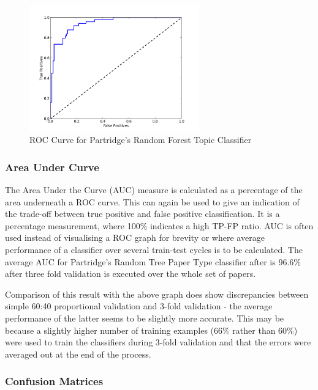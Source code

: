 \begin{figure}[!h]
\begin{center}
\includegraphics[width=0.65\textwidth]{images/testing/ROC.png}
\caption{ ROC Curve for Partridge's Random Forest Topic Classifier}
\label{fig:roc_random_forest}
\end{center}
\end{figure}

\subsubsection{ Area Under Curve }

The Area Under the Curve (AUC) measure is calculated as a percentage of  the
area underneath a ROC curve. This can again be used to give an indication of
the trade-off between true positive and false positive classification. It is a
percentage measurement, where 100\% indicates a high TP-FP ratio. AUC is often
used instead of visualising a ROC graph for brevity or where average
performance of a classifier over several train-test cycles is to be calculated.
The average AUC for Partridge's Random Tree Paper Type classifier after is
96.6\% after three fold validation is executed over the whole set of papers.

Comparison of this result with the above graph does show discrepancies between
simple 60:40 proportional validation and 3-fold validation - the average
performance of the latter seems to be slightly more accurate. This may be
because a slightly higher number of training examples (66\% rather than 60\%)
were used to train the classifiers during 3-fold validation and that the errors
were averaged out at the end of the process.

\subsubsection{ Confusion Matrices}

